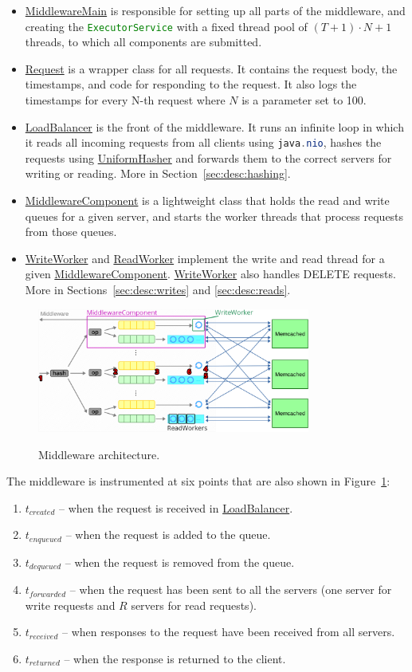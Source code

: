 \documentclass[11pt]{article}
\newcommand{\code}[1]{\lstinline[language=Java]{#1}}
\newcommand{\linkmain}[1]{\href{https://gitlab.inf.ethz.ch/pungast/asl-fall16-project/blob/master/src/main/java/asl/#1.java}{#1}}
\begin{document}
\begin{itemize}
\item \linkmain{MiddlewareMain} is responsible for setting up all parts of the middleware, and creating the \code{ExecutorService} with a fixed thread pool of $(T+1) \cdot N + 1$ threads, to which all components are submitted.
\item \linkmain{Request} is a wrapper class for all requests. It contains the request body, the timestamps, and code for responding to the request. It also logs the timestamps for every N-th request where $N$ is a parameter set to 100.
\item \linkmain{LoadBalancer} is the front of the middleware. It runs an infinite loop in which it reads all incoming requests from all clients using \code{java.nio}, hashes the requests using \linkmain{UniformHasher} and forwards them to the correct servers for writing or reading. More in Section~\ref{sec:desc:hashing}.
\item \linkmain{MiddlewareComponent} is a lightweight class that holds the read and write queues for a given server, and starts the worker threads that process requests from those queues.
\item \linkmain{WriteWorker} and \linkmain{ReadWorker} implement the write and read thread for a given \linkmain{MiddlewareComponent}. \linkmain{WriteWorker} also handles DELETE requests. More in Sections~\ref{sec:desc:writes} and \ref{sec:desc:reads}.
\end{itemize}

\begin{figure}[h]
\centering
\includegraphics[width=0.8\textwidth]{figures/structure.png}
\label{fig:structure}
\caption{Middleware architecture.}
\end{figure}

The middleware is instrumented at six points that are also shown in Figure~\ref{fig:structure}:
\begin{enumerate}
\item $t_{created}$ -- when the request is received in \linkmain{LoadBalancer}.
\item $t_{enqueued}$ -- when the request is added to the queue.
\item $t_{dequeued}$ -- when the request is removed from the queue.
\item $t_{forwarded}$ -- when the request has been sent to all the servers (one server for write requests and $R$ servers for read requests).
\item $t_{received}$ -- when responses to the request have been received from all servers.
\item $t_{returned}$ -- when the response is returned to the client.
\end{enumerate}
\end{document}
